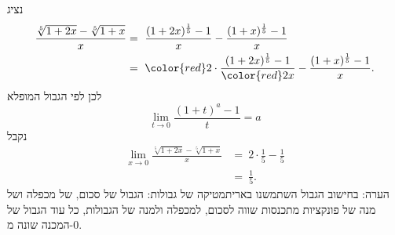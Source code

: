 \begin{enumerate}
\ifsol
{}
\begin{solbox}
נציג
\begin{align*}
    \frac{\sqrt[5]{1+2x}-\sqrt[5]{1+x}}{x}
    &=\ \frac{(1+2x)^{\frac15}-1}{x}-\frac{(1+x)^{\frac15}-1}{x}\\
    &=\ {\color{red}2}\cdot\frac{(1+2x)^{\frac15}-1}{{\color{red}2}x}-\frac{(1+x)^{\frac15}-1}{x}.
\end{align*}
לכן לפי הגבול המופלא
$$\lim_{t\to0}\frac{(1+t)^a-1}{t}=a$$
נקבל
\begin{align*}
    \lim_{x\to0}\frac{\sqrt[5]{1+2x}-\sqrt[5]{1+x}}{x}
    &=\ 2\cdot\frac15-\frac15\\
    &=\ \frac15.
\end{align*}
הערה: בחישוב הגבול השתמשנו באריתמטיקה של גבולות: הגבול של סכום, של מכפלה ושל מנה של פונקציות מתכנסות שווה לסכום, למכפלה ולמנה של הגבולות, כל עוד הגבול של המכנה שונה מ-$0$.
\end{solbox}
\fi
\eMs
\end{enumerate}
